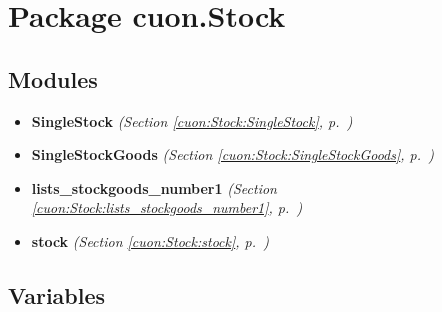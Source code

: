%
%
%


\section{Package cuon.Stock}

    \label{cuon:Stock}


\subsection{Modules}

\begin{itemize}
\setlength{\parskip}{0ex}
\item \textbf{SingleStock}
  \textit{(Section \ref{cuon:Stock:SingleStock}, p.~\pageref{cuon:Stock:SingleStock})}

\item \textbf{SingleStockGoods}
  \textit{(Section \ref{cuon:Stock:SingleStockGoods}, p.~\pageref{cuon:Stock:SingleStockGoods})}

\item \textbf{lists\_stockgoods\_number1}
  \textit{(Section \ref{cuon:Stock:lists_stockgoods_number1}, p.~\pageref{cuon:Stock:lists_stockgoods_number1})}

\item \textbf{stock}
  \textit{(Section \ref{cuon:Stock:stock}, p.~\pageref{cuon:Stock:stock})}

\end{itemize}



  \subsection{Variables}

